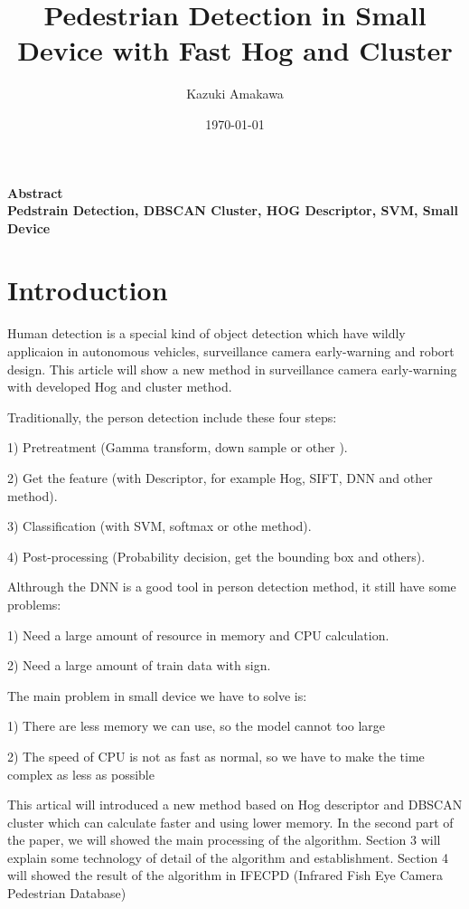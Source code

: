 \documentclass[12pt]{article}
\title{Pedestrian Detection in Small Device with Fast Hog and Cluster}
\author{Kazuki Amakawa}
\date{\today}
\theoremstyle{plain}
\begin{document}
\maketitle
\noindent \textbf{Abstract}\\

\noindent \textbf{Pedstrain Detection, DBSCAN Cluster, HOG Descriptor, SVM, Small Device} \\
\newpage

\section{Introduction}
Human detection is a special kind of object detection which have wildly applicaion in autonomous vehicles, surveillance camera early-warning and robort design. This article will show a new method in surveillance camera early-warning with developed Hog and cluster method.


Traditionally, the person detection include these four steps:

1) Pretreatment (Gamma transform, down sample or other ).

2) Get the feature (with Descriptor, for example Hog, SIFT, DNN and other method).

3) Classification (with SVM, softmax or othe method).

4) Post-processing (Probability decision, get the bounding box and others).


Althrough the DNN is a good tool in person detection method, it still have some problems:

1) Need a large amount of resource in memory and CPU calculation.

2) Need a large amount of train data with sign.


The main problem in small device we have to solve is:

1) There are less memory we can use, so the model cannot too large

2) The speed of CPU is not as fast as normal, so we have to make the time complex as less as possible

This artical will introduced a new method based on Hog descriptor and DBSCAN cluster which can calculate faster and using lower memory. In the second part of the paper, we will showed the main processing of the algorithm. Section 3 will explain some technology of detail of the algorithm and establishment. Section 4 will showed the result of the algorithm in IFECPD (Infrared Fish Eye Camera Pedestrian Database)
\end{document}
